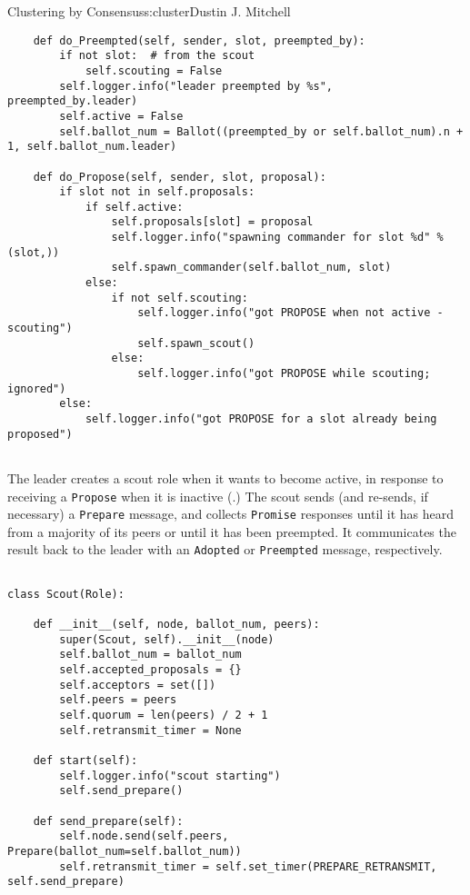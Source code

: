 \begin{aosachapter}{Clustering by Consensus}{s:cluster}{Dustin J. Mitchell}
\begin{verbatim}
    def do_Preempted(self, sender, slot, preempted_by):
        if not slot:  # from the scout
            self.scouting = False
        self.logger.info("leader preempted by %s", preempted_by.leader)
        self.active = False
        self.ballot_num = Ballot((preempted_by or self.ballot_num).n + 1, self.ballot_num.leader)

    def do_Propose(self, sender, slot, proposal):
        if slot not in self.proposals:
            if self.active:
                self.proposals[slot] = proposal
                self.logger.info("spawning commander for slot %d" % (slot,))
                self.spawn_commander(self.ballot_num, slot)
            else:
                if not self.scouting:
                    self.logger.info("got PROPOSE when not active - scouting")
                    self.spawn_scout()
                else:
                    self.logger.info("got PROPOSE while scouting; ignored")
        else:
            self.logger.info("got PROPOSE for a slot already being proposed")
    
\end{verbatim}

The leader creates a scout role when it wants to become active, in
response to receiving a \texttt{Propose} when it is inactive
(.) The scout sends (and re-sends,
if necessary) a \texttt{Prepare} message, and collects \texttt{Promise}
responses until it has heard from a majority of its peers or until it
has been preempted. It communicates the result back to the leader with
an \texttt{Adopted} or \texttt{Preempted} message, respectively.


\begin{verbatim}

class Scout(Role):

    def __init__(self, node, ballot_num, peers):
        super(Scout, self).__init__(node)
        self.ballot_num = ballot_num
        self.accepted_proposals = {}
        self.acceptors = set([])
        self.peers = peers
        self.quorum = len(peers) / 2 + 1
        self.retransmit_timer = None

    def start(self):
        self.logger.info("scout starting")
        self.send_prepare()

    def send_prepare(self):
        self.node.send(self.peers, Prepare(ballot_num=self.ballot_num))
        self.retransmit_timer = self.set_timer(PREPARE_RETRANSMIT, self.send_prepare)


\end{verbatim}
\end{aosachapter}
